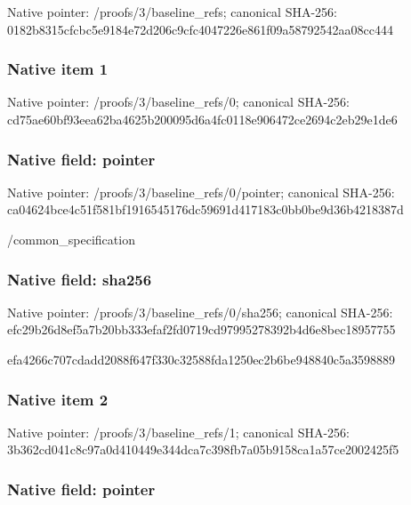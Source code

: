 \documentclass[10pt,a4paper]{article}
\begin{document}
Native pointer: /proofs/3/baseline\_refs; canonical SHA-256: 0182b8315cfcbc5e9184e72d\allowbreak{}206c9cfc4047226e861f09a5\allowbreak{}8792542aa08cc444



\subsubsection{Native item 1}


Native pointer: /proofs/3/baseline\_refs/0; canonical SHA-256: cd75ae60bf93eea62ba4625b\allowbreak{}200095d6a4fc0118e906472c\allowbreak{}e2694c2eb29e1de6



\subsubsection{Native field: pointer}


Native pointer: /proofs/3/baseline\_refs/0/pointer; canonical SHA-256: ca04624bce4c51f581bf1916\allowbreak{}545176dc59691d417183c0bb\allowbreak{}0be9d36b4218387d


/common\_specification


\subsubsection{Native field: sha256}


Native pointer: /proofs/3/baseline\_refs/0/sha256; canonical SHA-256: efc29b26d8ef5a7b20bb333e\allowbreak{}faf2fd0719cd97995278392b\allowbreak{}4d6e8bec18957755


efa4266c707cdadd2088f647\allowbreak{}f330c32588fda1250ec2b6be\allowbreak{}948840c5a3598889


\subsubsection{Native item 2}


Native pointer: /proofs/3/baseline\_refs/1; canonical SHA-256: 3b362cd041c8c97a0d410449\allowbreak{}e344dca7c398fb7a05b9158c\allowbreak{}a1a57ce2002425f5



\subsubsection{Native field: pointer}
\end{document}
